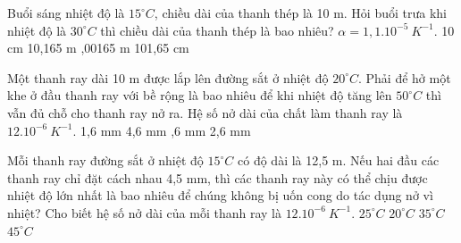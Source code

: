 \begin{vidu}%
	Buổi sáng nhiệt độ là $15^\circ C$, chiều dài của thanh thép là 10 m. Hỏi buổi trưa khi nhiệt độ là $30^\circ C$ thì chiều dài của thanh thép là bao nhiêu? $\alpha = 1,1. 10^{-5}\ K^{-1}$.
	\choice
	{10 cm}
	{10,165 m}
	{,00165 m}
	{101,65 cm}
\end{vidu}
\begin{vidu}%
	Một thanh ray dài 10 m được lắp lên đường sắt ở nhiệt độ $20^\circ C$. Phải để hở một khe ở đầu thanh ray với bề rộng là bao nhiêu để khi nhiệt độ tăng lên $50^\circ C$ thì vẫn đủ chỗ cho thanh ray nở ra. Hệ số nở dài của chất làm thanh ray là $12.10^{-6}\ K^{-1}$.
	\choice
	{1,6 mm}
	{4,6 mm}
	{,6 mm}
	{2,6 mm}
\end{vidu}

\begin{vidu}%
	Mỗi thanh ray đường sắt ở nhiệt độ $15^\circ C$ có độ dài là 12,5 m. Nếu hai đầu các thanh ray chỉ đặt cách nhau 4,5 mm, thì các thanh ray này có thể chịu được nhiệt độ lớn nhất là bao nhiêu để chúng không bị uốn cong do tác dụng nở vì nhiệt? Cho biết hệ số nở dài của mỗi thanh ray là $12. 10^{-6}\ K^{-1}$.
	\choice
	{$25^\circ C$}
	{$20^\circ C$}
	{$35^\circ C$}
	{\True $45^\circ C$}
\end{vidu}

